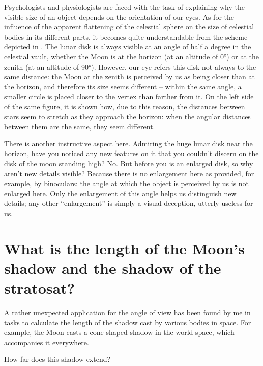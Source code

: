 Psychologists and physiologists are faced with the task of explaining why the visible size of an object depends on the orientation of our eyes. As for the influence of the apparent flattening of the celestial sphere on the size of celestial bodies in its different parts, it becomes quite understandable from the scheme depicted in . The lunar disk is always visible at an angle of half a degree in the celestial vault, whether the Moon is at the horizon (at an altitude of \ang{0}) or at the zenith (at an altitude of \ang{90}). However, our eye refers this disk not always to the same distance: the Moon at the zenith is perceived by us as being closer than at the horizon, and therefore its size seems different -- within the same angle, a smaller circle is placed closer to the vertex than farther from it. On the left side of the same figure, it is shown how, due to this reason, the distances between stars seem to stretch as they approach the horizon: when the angular distances between them are the same, they seem different.

There is another instructive aspect here. Admiring the huge lunar disk near the horizon, have you noticed any new features on it that you couldn't discern on the disk of the moon standing high? No. But before you is an enlarged disk, so why aren't new details visible? Because there is no enlargement here as provided, for example, by binoculars: the angle at which the object is perceived by us is not enlarged here. Only the enlargement of this angle helps us distinguish new details; any other ``enlargement'' is simply a visual deception, utterly useless for us.

\clearpage

\section{What is the length of the Moon's shadow and the shadow of the stratosat?}
\label{sec-3.14}

A rather unexpected application for the angle of view has been found by me in tasks to calculate the length of the shadow cast by various bodies in space. For example, the Moon casts a cone-shaped shadow in the world space, which accompanies it everywhere.

How far does this shadow extend?

